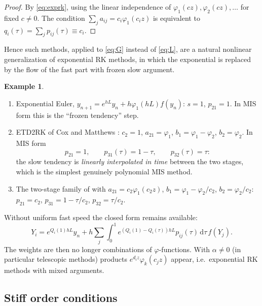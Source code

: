 \documentclass[11pt,a4paper]{article}
\theoremstyle{definition}
\newtheorem{example}[theorem]{Example}
\theoremstyle{remark}
\newcommand{\dd}{\,\mathrm{d}}
\begin{document}
\begin{proof}
By \eqref{eq:exprk}, using the linear independence of
$\varphi_1(cz),\varphi_2(cz),\dots$ for fixed $c\neq0$. The condition
$\sum_ja_{ij}=c_i\varphi_1(c_iz)$ is equivalent to
$q_i(\tau)=\sum_jp_{ij}(\tau)\equiv c_i$.
\end{proof}

Hence such methods, applied to \eqref{eq:G} instead of \eqref{eq:L},
are a natural nonlinear generalization of exponential RK methods, in
which the exponential is replaced by the flow of the fast part with
frozen slow argument.

\begin{example}\label{ex:etd}
\begin{enumerate}[label=(\alph*)]
\item Exponential Euler, $y_{n+1}=e^{hL}y_n+h\varphi_1(hL)f(y_n)$:
  $s=1$, $p_{21}=1$. In MIS form this is the ``frozen tendency''
  step.
\item ETD2RK of Cox and Matthews \cite{CoxMatthews2002}: $c_2=1$,
  $a_{21}=\varphi_1$, $b_1=\varphi_1-\varphi_2$, $b_2=\varphi_2$. In MIS
  form
  \begin{equation*}
   p_{21}=1,\qquad p_{31}(\tau)=1-\tau,\qquad p_{32}(\tau)=\tau:
  \end{equation*}
  the slow tendency is \emph{linearly interpolated in time} between the
  two stages, which is the simplest genuinely polynomial MIS method.
\item The two-stage family of \cite{HochbruckOstermann2005} with
  $a_{21}=c_2\varphi_1(c_2z)$, $b_1=\varphi_1-\varphi_2/c_2$,
  $b_2=\varphi_2/c_2$: $p_{21}=c_2$, $p_{31}=1-\tau/c_2$,
  $p_{32}=\tau/c_2$.
\end{enumerate}
\end{example}

Without uniform fast speed the closed form remains available:
\begin{equation*}
Y_i=e^{Q_i(1)hL}y_n+h\sum_j\int_0^1e^{(Q_i(1)-Q_i(\tau))hL}p_{ij}(\tau)\dd\tau\,f(Y_j).
\end{equation*}
The weights are then no longer combinations of $\varphi$-functions. With
$\alpha\neq0$ (in particular telescopic methods) products
$e^{d_iz}\varphi_k(c_jz)$ appear, i.e.\ exponential RK methods with mixed
arguments.

\subsection{Stiff order conditions}
\end{document}

